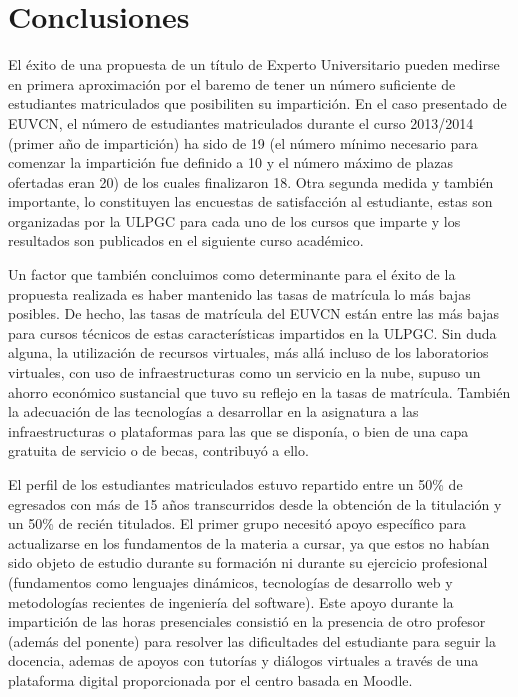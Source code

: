 \documentclass[conference]{IEEEtran}
\begin{document}
\section{Conclusiones \label{sec:conclusiones}}

El éxito de una propuesta de un título de Experto Universitario pueden medirse
en primera aproximación por el baremo de tener un número suficiente de
estudiantes matriculados que posibiliten su impartición. En el caso presentado
de EUVCN, el número de estudiantes matriculados durante el curso 2013/2014
(primer año de impartición) ha sido  de 19 (el número mínimo necesario para
comenzar la impartición fue definido a
10 y  el número máximo de plazas ofertadas eran 20) de los cuales finalizaron
18. Otra
segunda medida y también importante, lo constituyen las encuestas de
satisfacción al estudiante, estas son organizadas por la ULPGC para cada uno de los cursos que imparte y los resultados son publicados en el siguiente curso académico.

Un factor que también concluimos como determinante para el éxito de la
propuesta realizada es haber mantenido las tasas de matrícula lo más bajas
posibles. De hecho, las tasas de matrícula del EUVCN están entre las más bajas
para cursos técnicos de estas características impartidos en la ULPGC. Sin duda
alguna, la utilización de recursos virtuales, más allá incluso de los
laboratorios virtuales, con uso de infraestructuras como un servicio en la
nube, supuso un ahorro económico sustancial que tuvo su reflejo en la tasas de
matrícula. También la adecuación de las tecnologías a desarrollar en la asignatura a
las infraestructuras o plataformas para las que se disponía, o bien de una
capa gratuita de servicio o de becas, contribuyó a ello.

El perfil de los estudiantes matriculados estuvo repartido entre un
50\% de egresados con más de 15 años transcurridos desde la obtención de la
titulación y un 50\% de recién titulados.
El primer grupo necesitó apoyo específico para actualizarse en los fundamentos
de la materia a cursar, ya que estos no habían sido objeto de estudio durante su
formación ni durante su ejercicio profesional (fundamentos como lenguajes
dinámicos, tecnologías de desarrollo web y metodologías recientes de ingeniería
del software). Este apoyo durante la impartición de las horas presenciales
consistió en la presencia de otro profesor (además del ponente) para resolver
las dificultades del estudiante para seguir la docencia, ademas de apoyos con
tutorías y diálogos virtuales a través de una plataforma digital proporcionada
por el centro basada en Moodle.
\end{document}

